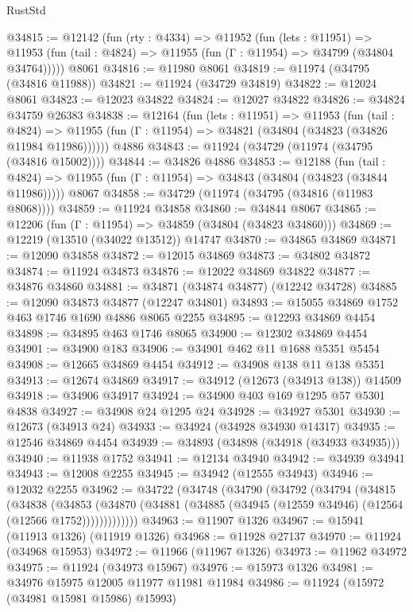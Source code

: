 \begin{lexlean}{RustStd}
\begin{coremodule}
@34815 := @12142
    (fun (rty : @4334) =>
    @11952
      (fun (lets : @11951) =>
      @11953 (fun (tail : @4824) => @11955 (fun (Γ : @11954) => @34799 (@34804 @34764)))))
    @8061
@34816 := @11980 @8061
@34819 := @11974 (@34795 (@34816 @11988))
@34821 := @11924 (@34729 @34819)
@34822 := @12024 @8061
@34823 := @12023 @34822
@34824 := @12027 @34822
@34826 := @34824 @34759 @26383
@34838 := @12164
    (fun (lets : @11951) =>
    @11953
      (fun (tail : @4824) =>
      @11955 (fun (Γ : @11954) => @34821 (@34804 (@34823 (@34826 @11984 @11986))))))
    @4886
@34843 := @11924 (@34729 (@11974 (@34795 (@34816 @15002))))
@34844 := @34826 @4886
@34853 := @12188
    (fun (tail : @4824) => @11955 (fun (Γ : @11954) => @34843 (@34804 (@34823 (@34844 @11986)))))
    @8067
@34858 := @34729 (@11974 (@34795 (@34816 (@11983 @8068))))
@34859 := @11924 @34858
@34860 := @34844 @8067
@34865 := @12206 (fun (Γ : @11954) => @34859 (@34804 (@34823 @34860)))
@34869 := @12219 (@13510 (@34022 @13512)) @14747
@34870 := @34865 @34869
@34871 := @12090 @34858
@34872 := @12015 @34869
@34873 := @34802 @34872
@34874 := @11924 @34873
@34876 := @12022 @34869 @34822
@34877 := @34876 @34860
@34881 := @34871 (@34874 @34877) (@12242 @34728)
@34885 := @12090 @34873 @34877 (@12247 @34801)
@34893 := @15055 @34869 @1752 @463 @1746 @1690 @4886 @8065 @2255
@34895 := @12293 @34869 @4454
@34898 := @34895 @463 @1746 @8065
@34900 := @12302 @34869 @4454
@34901 := @34900 @183
@34906 := @34901 @462 @11 @1688 @5351 @5454
@34908 := @12665 @34869 @4454
@34912 := @34908 @138 @11 @138 @5351
@34913 := @12674 @34869
@34917 := @34912 (@12673 (@34913 @138)) @14509
@34918 := @34906 @34917
@34924 := @34900 @403 @169 @1295 @57 @5301 @4838
@34927 := @34908 @24 @1295 @24
@34928 := @34927 @5301
@34930 := @12673 (@34913 @24)
@34933 := @34924 (@34928 @34930 @14317)
@34935 := @12546 @34869 @4454
@34939 := @34893 (@34898 (@34918 (@34933 @34935)))
@34940 := @11938 @1752
@34941 := @12134 @34940
@34942 := @34939 @34941
@34943 := @12008 @2255
@34945 := @34942 (@12555 @34943)
@34946 := @12032 @2255
@34962 := @34722
    (@34748
      (@34790
        (@34792
          (@34794
            (@34815
              (@34838
                (@34853
                  (@34870 (@34881 (@34885 (@34945 (@12559 @34946) (@12564 (@12566 @1752)))))))))))))
@34963 := @11907 @1326
@34967 := @15941 (@11913 @1326) (@11919 @1326)
@34968 := @11928 @27137
@34970 := @11924 (@34968 @15953)
@34972 := @11966 (@11967 @1326)
@34973 := @11962 @34972
@34975 := @11924 (@34973 @15967)
@34976 := @15973 @1326
@34981 := @34976 @15975 @12005 @11977 @11981 @11984
@34986 := @11924 (@15972 (@34981 @15981 @15986) @15993)

\end{coremodule}
\end{lexlean}

